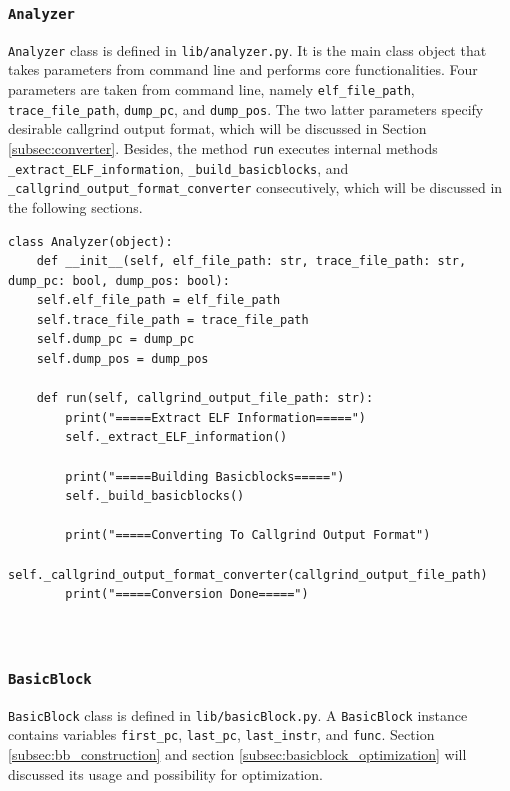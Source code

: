 \subsubsection{\texttt{Analyzer}}
\texttt{Analyzer} class is defined in \texttt{lib/analyzer.py}. It is the main class object that takes parameters from command line and performs core functionalities. Four parameters are taken from command line, namely \texttt{elf\_file\_path}, \texttt{trace\_file\_path}, \texttt{dump\_pc}, and \texttt{dump\_pos}. The two latter parameters specify desirable callgrind output format, which will be discussed in Section \ref{subsec:converter}. Besides, the method \texttt{run} executes internal methods \texttt{\_extract\_ELF\_information}, \texttt{\_build\_basicblocks}, and \texttt{\_callgrind\_output\_format\_converter} consecutively, which will be discussed in the following sections.

\begin{center}
\begin{minipage}{\textwidth}
\begin{lstlisting}
class Analyzer(object):
    def __init__(self, elf_file_path: str, trace_file_path: str, dump_pc: bool, dump_pos: bool):
    self.elf_file_path = elf_file_path
    self.trace_file_path = trace_file_path
    self.dump_pc = dump_pc
    self.dump_pos = dump_pos

    def run(self, callgrind_output_file_path: str):
        print("=====Extract ELF Information=====")
        self._extract_ELF_information()
        
        print("=====Building Basicblocks=====")
        self._build_basicblocks()

        print("=====Converting To Callgrind Output Format")
        self._callgrind_output_format_converter(callgrind_output_file_path)
        print("=====Conversion Done=====")

    
\end{lstlisting}
\end{minipage}
\end{center}

\subsubsection{\texttt{BasicBlock}}

\texttt{BasicBlock} class is defined in \texttt{lib/basicBlock.py}. A \texttt{BasicBlock} instance contains variables \texttt{first\_pc}, \texttt{last\_pc}, \texttt{last\_instr}, and \texttt{func}. Section \ref{subsec:bb_construction} and section \ref{subsec:basicblock_optimization} will discussed its usage and possibility for optimization. 

